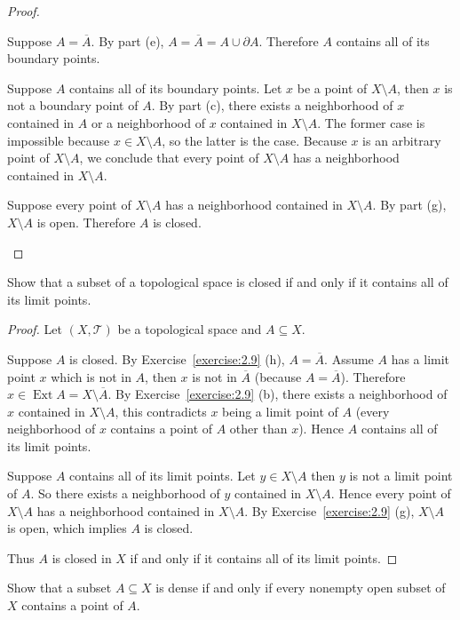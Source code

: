 \begin{proof}
\begin{enumerate}[label={(\alph*)}]
		      Suppose $A = \overline{A}$. By part (e), $A = \overline{A} = A\cup\partial A$. Therefore $A$ contains all of its boundary points.

		      Suppose $A$ contains all of its boundary points. Let $x$ be a point of $X\setminus A$, then $x$ is not a boundary point of $A$. By part (c), there exists a neighborhood of $x$ contained in $A$ or a neighborhood of $x$ contained in $X\setminus A$. The former case is impossible because $x\in X\setminus A$, so the latter is the case. Because $x$ is an arbitrary point of $X\setminus A$, we conclude that every point of $X\setminus A$ has a neighborhood contained in $X\setminus A$.

		      Suppose every point of $X\setminus A$ has a neighborhood contained in $X\setminus A$. By part (g), $X\setminus A$ is open. Therefore $A$ is closed.
	\end{enumerate}
\end{proof}

\begin{exercise}{2.10}
	Show that a subset of a topological space is closed if and only if it contains all of its limit points.
\end{exercise}

\begin{proof}
	Let $(X, \mathscr{T})$ be a topological space and $A\subseteq X$.

	Suppose $A$ is closed. By Exercise~\ref{exercise:2.9} (h), $A = \overline{A}$. Assume $A$ has a limit point $x$ which is not in $A$, then $x$ is not in $\overline{A}$ (because $A = \overline{A}$). Therefore $x\in\operatorname{Ext} A = X\setminus\overline{A}$. By Exercise~\ref{exercise:2.9} (b), there exists a neighborhood of $x$ contained in $X\setminus A$, this contradicts $x$ being a limit point of $A$ (every neighborhood of $x$ contains a point of $A$ other than $x$). Hence $A$ contains all of its limit points.

	Suppose $A$ contains all of its limit points. Let $y\in X\setminus A$ then $y$ is not a limit point of $A$. So there exists a neighborhood of $y$ contained in $X\setminus A$. Hence every point of $X\setminus A$ has a neighborhood contained in $X\setminus A$. By Exercise~\ref{exercise:2.9} (g), $X\setminus A$ is open, which implies $A$ is closed.

	Thus $A$ is closed in $X$ if and only if it contains all of its limit points.
\end{proof}

\begin{exercise}{2.11}
	Show that a subset $A \subseteq X$ is dense if and only if every nonempty open subset of $X$ contains a point of $A$.
\end{exercise}

